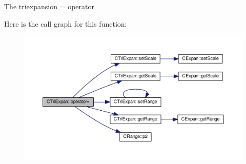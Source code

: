 \begin{DoxyItemize}
\item The triexpansion = operator 
\end{DoxyItemize}

Here is the call graph for this function\-:\nopagebreak
\begin{figure}[H]
\begin{center}
\leavevmode
\includegraphics[width=350pt]{classCTriExpan_afbe552370cd3a3f9f65742224d86bb16_cgraph}
\end{center}
\end{figure}



